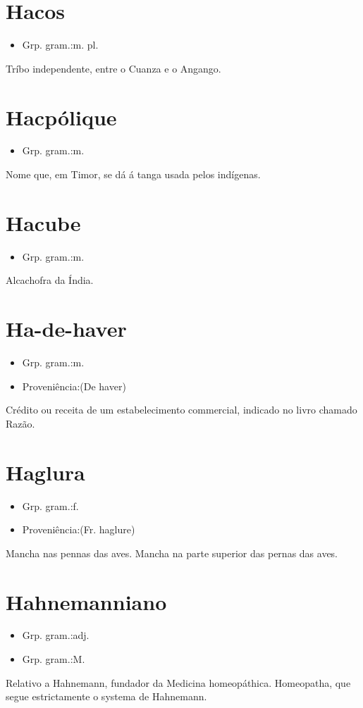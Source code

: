 \documentclass{article}
\begin{document}
\section{Hacos}
\begin{itemize}
\item {Grp. gram.:m. pl.}
\end{itemize}
Tríbo independente, entre o Cuanza e o Angango.
\section{Hacpólique}
\begin{itemize}
\item {Grp. gram.:m.}
\end{itemize}
Nome que, em Timor, se dá á tanga usada pelos indígenas.
\section{Hacube}
\begin{itemize}
\item {Grp. gram.:m.}
\end{itemize}
Alcachofra da Índia.
\section{Ha-de-haver}
\begin{itemize}
\item {Grp. gram.:m.}
\end{itemize}
\begin{itemize}
\item {Proveniência:(De \textunderscore haver\textunderscore )}
\end{itemize}
Crédito ou receita de um estabelecimento commercial, indicado no livro chamado \textunderscore Razão\textunderscore .
\section{Haglura}
\begin{itemize}
\item {Grp. gram.:f.}
\end{itemize}
\begin{itemize}
\item {Proveniência:(Fr. \textunderscore haglure\textunderscore )}
\end{itemize}
Mancha nas pennas das aves.
Mancha na parte superior das pernas das aves.
\section{Hahnemanniano}
\begin{itemize}
\item {Grp. gram.:adj.}
\end{itemize}
\begin{itemize}
\item {Grp. gram.:M.}
\end{itemize}
Relativo a Hahnemann, fundador da Medicina homeopáthica.
Homeopatha, que segue estrictamente o systema de Hahnemann.
\end{document}
